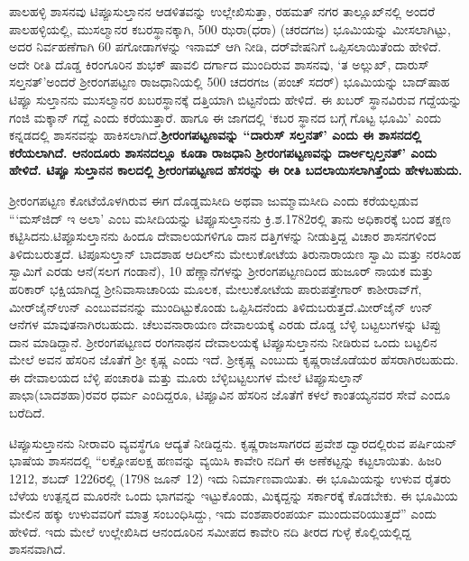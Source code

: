 ಪಾಲಹಳ್ಳಿ ಶಾಸನವು ಟಿಪ್ಪೂಸುಲ್ತಾನನ ಆಡಳಿತವನ್ನು ಉಲ್ಲೇಖಿಸುತ್ತಾ, ರಹಮತ್ ನಗರ ತಾಲ್ಲೂಖ್‌ನಲ್ಲಿ ಅಂದರೆ ಪಾಲಹಳ್ಳಿಯಲ್ಲಿ, ಮುಸಲ್ಮಾನರ ಕಬರಸ್ಥಾನಕ್ಕಾಗಿ, 500 ಝರಾ(ಧರಾ) (ಚರದಗಜ) ಭೂಮಿಯನ್ನು ಮೀಸಲಾಗಿಟ್ಟು, ಅದರ ನಿರ್ವಹಣೆಗಾಗಿ 60 ಪಗೋಡಾಗಳನ್ನು ಇನಾಮ್ ಆಗಿ ನೀಡಿ, ದರ್​ವೇಷನಿಗೆ ಒಪ್ಪಿಸಲಾಯಿತೆಂದು ಹೇಳಿದೆ. ಅದೇ ರೀತಿ ದೊಡ್ಡ ಕಿರಂಗೂರಿನ ಶುಭಕ್ ಷಾವಲಿ ದರ್ಗಾದ ಮುಂದಿರುವ ಶಾಸನವು, `ತ ಅಲ್ಲುಖ್, ದಾರುಸ್ ಸಲ್ತನತ್'\break ಅಂದರೆ ಶ‍್ರೀರಂಗಪಟ್ಟಣ ರಾಜಧಾನಿಯಲ್ಲಿ 500 ಚದರಗಜ (ಪಂಚ್ ಸದರ್) ಭೂಮಿಯನ್ನು ಬಾದ್‌ಷಾಹ ಟಿಪ್ಪೂ ಸುಲ್ತಾನನು ಮುಸಲ್ಮಾನರ ಖಬರಸ್ಥಾನಕ್ಕೆ ದತ್ತಿಯಾಗಿ ಬಿಟ್ಟನೆಂದು ಹೇಳಿದೆ. ಈ ಖಬರ್ ಸ್ಥಾನವಿರುವ ಗದ್ದೆಯನ್ನು \hbox{ಗಂಜಿ} ಮಕ್ಕಾನ್ ಗದ್ದೆ ಎಂದು ಕರೆಯುತ್ತಾರೆ. ಹಾಗೂ ಈ ಜಾಗದಲ್ಲಿ `ಕಬರ ಸ್ಥಾನದ ಬಗ್ಗೆ ಗೊಟ್ಟ ಭೂಮಿ' ಎಂದು ಕನ್ನಡದಲ್ಲಿ ಶಾಸನವನ್ನು ಹಾಕಿಸಲಾಗಿದೆ.\textbf{ಶ‍್ರೀರಂಗಪಟ್ಟಣವನ್ನು ``ದಾರುಸ್ ಸಲ್ತನತ್' ಎಂದು ಈ ಶಾಸನದಲ್ಲಿ ಕರೆಯಲಾಗಿದೆ. \hbox{ಆನಂದೂರು} ಶಾಸನದಲ್ಲೂ ಕೂಡಾ ರಾಜಧಾನಿ ಶ‍್ರೀರಂಗಪಟ್ಟಣವನ್ನು ದಾರ್\enginline{-}ಅಲ್\enginline{-}ಸಲ್ತನತ್' ಎಂದು ಹೇಳಿದೆ. ಟಿಪ್ಪೂ ಸುಲ್ತಾನನ ಕಾಲದಲ್ಲಿ ಶ‍್ರೀರಂಗಪಟ್ಟಣದ ಹೆಸರನ್ನು ಈ ರೀತಿ ಬದಲಾಯಿಸಲಾಗಿತ್ತೆಂದು ಹೇಳಬಹುದು.}

ಶ‍್ರೀರಂಗಪಟ್ಟಣ ಕೋಟೆಯೊಳಗಿರುವ ಈಗ ದೊಡ್ಡಮಸೀದಿ ಅಥವಾ ಜುಮ್ಮಾಮಸೀದಿ ಎಂದು ಕರೆಯಲ್ಪಡುವ ```ಮಸ್‌ಜಿದ್ ಇ ಅಲಾ' ಎಂಬ ಮಸೀದಿಯನ್ನು ಟಿಪ್ಪೂಸುಲ್ತಾನನು ಕ್ರಿ.ಶ.1782ರಲ್ಲಿ ತಾನು ಅಧಿಕಾರಕ್ಕೆ ಬಂದ ತಕ್ಷಣ ಕಟ್ಟಿಸಿದನು.ಟಿಪ್ಪೂಸುಲ್ತಾನನು ಹಿಂದೂ ದೇವಾಲಯಗಳಿಗೂ ದಾನ ದತ್ತಿಗಳನ್ನು ನೀಡುತ್ತಿದ್ದ ವಿಚಾರ ಶಾಸನಗಳಿಂದ ತಿಳಿದುಬರುತ್ತದೆ. ಟಿಪೂಸುಲ್ತಾನ್ ಬಾದಶಾಹ ಆದಿಲ್‌ನು ಮೇಲುಕೋಟೆಯ ತಿರುನಾರಾಯಣ ಸ್ವಾಮಿ ಮತ್ತು ನರಸಿಂಹ ಸ್ವಾಮಿಗೆ ಎರಡು ಆನೆ(ಸಲಗ ಗಂಡಾನೆ), 10 ಹೆಣ್ಣಾನೆಗಳನ್ನು ಶ‍್ರೀರಂಗಪಟ್ಟಣದಿಂದ ಹುಜೂರ್ ನಾಯಕ ಮತ್ತು ಹರಿಕಾರ್ ಭಕ್ಷಿಯಾಗಿದ್ದ ಶ‍್ರೀನಿವಾಸಾಚಾರಿಯ ಮೂಲಕ, ಮೇಲುಕೋಟೆಯ ಪಾರುಪತ್ತೇಗಾರ್ ಕಾಶೀರಾವ್‌ಗೆ, ಮೀರ್‌ಜೈನ್‌ಉನ್ ಎಂಬುವವನನ್ನು ಮುಂದಿಟ್ಟುಕೊಂಡು ಒಪ್ಪಿಸಿದನೆಂದು ತಿಳಿದುಬರುತ್ತದೆ.ಮೀರ್‌ಜೈನ್ ಉನ್ ಆನೆಗಳ ಮಾವುತ\-ನಾಗಿರಬಹುದು. ಚೆಲುವನಾರಾಯಣ ದೇವಾಲಯಕ್ಕೆ ಎರಡು ದೊಡ್ಡ ಬೆಳ್ಳಿ ಬಟ್ಟಲುಗಳನ್ನು ಟಿಪ್ಪು ದಾನ ಮಾಡಿದ್ದಾನೆ. ಶ‍್ರೀರಂಗಪಟ್ಟಣದ ರಂಗನಾಥನ ದೇವಾಲಯಕ್ಕೆ ಟಿಪ್ಪೂಸುಲ್ತಾನನು ನೀಡಿರುವ ಒಂದು ಬಟ್ಟಲಿನ ಮೇಲೆ ಅವನ ಹೆಸರಿನ ಜೊತೆಗೆ ಶ‍್ರೀ ಕೃಷ್ಣ ಎಂದು ಇದೆ. ಶ‍್ರೀಕೃಷ್ಣ ಎಂಬುದು ಕೃಷ್ಣರಾಜೊಡೆಯರ ಹೆಸರಾಗಿರಬಹುದು. ಈ ದೇವಾಲಯದ ಬೆಳ್ಳಿ ಪಂಚಾರತಿ ಮತ್ತು ಮೂರು ಬೆಳ್ಳಿಬಟ್ಟಲುಗಳ ಮೇಲೆ ಟಿಪ್ಪೂಸುಲ್ತಾನ್​ ಪಾಛಾ(ಬಾದಶಹಾ)ರವರ ಧರ್ಮ ಎಂದಿದ್ದರೂ, ಟಿಪ್ಪೂವಿನ ಹೆಸರಿನ ಜೊತೆಗೆ ಕಳಲೆ ಕಾಂತಯ್ಯನವರ ಸೇವೆ ಎಂದೂ ಬರೆದಿದೆ.

ಟಿಪ್ಪೂಸುಲ್ತಾನನು ನೀರಾವರಿ ವ್ಯವಸ್ಥೆಗೂ ಆದ್ಯತೆ ನೀಡಿದ್ದನು. ಕೃಷ್ಣರಾಜಸಾಗರದ ಪ್ರವೇಶ ದ್ವಾರದಲ್ಲಿರುವ ಪರ್ಷಿಯನ್​ ಭಾಷೆಯ ಶಾಸನದಲ್ಲಿ “ಲಕ್ಷೋಪಲಕ್ಷ ಹಣವನ್ನು ವ್ಯಯಿಸಿ ಕಾವೇರಿ ನದಿಗೆ ಈ ಅಣೆಕಟ್ಟನ್ನು ಕಟ್ಟಲಾಯಿತು. ಹಿಜರಿ 1212, ಶಬದ್​ 1226ರಲ್ಲಿ (1798 ಜೂನ್​ 12) ಇದು ನಿರ್ಮಾಣವಾಯಿತು. ಈ ಭೂಮಿಯನ್ನು ಉಳುವ ರೈತರು ಬೆಳೆಯ ಉತ್ಪನ್ನದ ಮೂರನೇ ಒಂದು ಭಾಗವನ್ನು ಇಟ್ಟುಕೊಂಡು, ಮಿಕ್ಕದ್ದನ್ನು ಸರ್ಕಾರಕ್ಕೆ ಕೊಡಬೇಕು. ಈ ಭೂಮಿಯ ಮೇಲಿನ ಹಕ್ಕು ಉಳುವವರಿಗೆ ಮಾತ್ರ ಸಂಬಂಧಿಸಿದ್ದು, ಇದು ವಂಶಪಾರಂಪರ್ಯ ಮುಂದುವರಿಯುತ್ತದೆ” ಎಂದು ಹೇಳಿದೆ. ಇದು ಮೇಲೆ ಉಲ್ಲೇಖಿಸಿದ ಆನಂದೂರಿನ ಸಮೀಪದ ಕಾವೇರಿ ನದಿ ತೀರದ ಗುಳ್ಳೆ ಕೊಲ್ಲಿಯಲ್ಲಿದ್ದ ಶಾಸನವಾಗಿದೆ.

